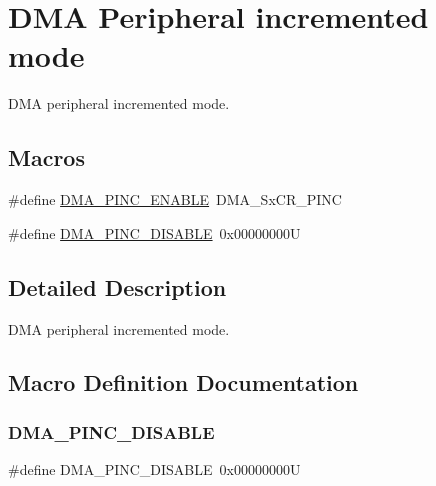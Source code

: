 \hypertarget{group___d_m_a___peripheral__incremented__mode}{}\section{D\+MA Peripheral incremented mode}
\label{group___d_m_a___peripheral__incremented__mode}


D\+MA peripheral incremented mode.  


\subsection*{Macros}
\begin{DoxyCompactItemize}
\item 
\#define \mbox{\hyperlink{group___d_m_a___peripheral__incremented__mode_gab6d84e5805302516d26c06fb4497a346}{D\+M\+A\+\_\+\+P\+I\+N\+C\+\_\+\+E\+N\+A\+B\+LE}}~D\+M\+A\+\_\+\+Sx\+C\+R\+\_\+\+P\+I\+NC
\item 
\#define \mbox{\hyperlink{group___d_m_a___peripheral__incremented__mode_ga63e2aff2973d1a8f01d5d7b6e4894f39}{D\+M\+A\+\_\+\+P\+I\+N\+C\+\_\+\+D\+I\+S\+A\+B\+LE}}~0x00000000U
\end{DoxyCompactItemize}


\subsection{Detailed Description}
D\+MA peripheral incremented mode. 



\subsection{Macro Definition Documentation}
\mbox{\label{group___d_m_a___peripheral__incremented__mode_ga63e2aff2973d1a8f01d5d7b6e4894f39}} 
\subsubsection{\texorpdfstring{DMA\_PINC\_DISABLE}{DMA\_PINC\_DISABLE}}
{\footnotesize\ttfamily \#define D\+M\+A\+\_\+\+P\+I\+N\+C\+\_\+\+D\+I\+S\+A\+B\+LE~0x00000000U}

